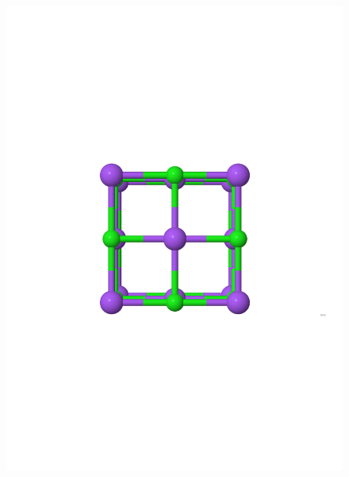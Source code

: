 \documentclass[11pt,oneside,czech,american]{book} %
\theoremstyle{definition} %
\theoremstyle{definition}
\begin{document}
\begin{figure}[H]       
	\includegraphics[scale=0.26]{rocksalt_nolabels.pdf}

\end{figure}
\end{document}
